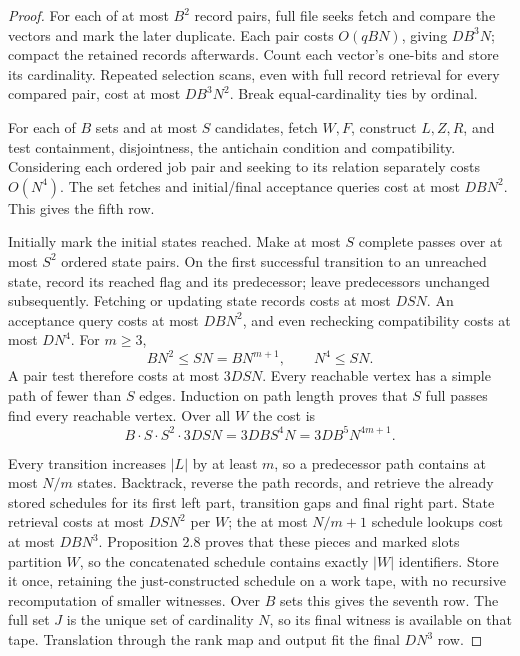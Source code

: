 \begin{proof}
For each of at most $B^2$ record pairs, full file seeks fetch and compare
the vectors and mark the later duplicate. Each pair costs $O(qBN)$,
giving $DB^3N$; compact the retained records afterwards. Count each
vector's one-bits and store its cardinality. Repeated selection scans,
even with full record retrieval for every compared pair, cost at most
$DB^3N^2$. Break equal-cardinality ties by ordinal.

For each of $B$ sets and at most $S$ candidates, fetch $W,F$, construct
$L,Z,R$, and test containment, disjointness, the antichain condition and
compatibility. Considering each ordered job pair and seeking to its
relation separately costs $O(N^4)$. The set fetches and initial/final
acceptance queries cost at most $DBN^2$. This gives the fifth row.

Initially mark the initial states reached. Make at most $S$ complete
passes over at most $S^2$ ordered state pairs. On the first successful
transition to an unreached state, record its reached flag and its
predecessor; leave predecessors unchanged subsequently. Fetching or
updating state records costs at most $DSN$. An acceptance query costs
at most $DBN^2$, and even rechecking compatibility costs at most $DN^4$.
For $m\geq3$,
\[
 BN^2\leq SN=BN^{m+1},\qquad N^4\leq SN.
\]
A pair test therefore costs at most $3DSN$. Every reachable vertex has
a simple path of fewer than $S$ edges. Induction on path length proves
that $S$ full passes find every reachable vertex. Over all $W$ the cost
is
\[
 B\cdot S\cdot S^2\cdot3DSN
   =3DBS^4N=3DB^5N^{4m+1}.\tag{9.3}
\]

Every transition increases $|L|$ by at least $m$, so a predecessor path
contains at most $N/m$ states. Backtrack, reverse the path records, and
retrieve the already stored schedules for its first left part,
transition gaps and final right part. State retrieval costs at most
$DSN^2$ per $W$; the at most $N/m+1$ schedule lookups cost at most
$DBN^3$. Proposition 2.8 proves that these pieces and marked slots
partition $W$, so the concatenated schedule contains exactly $|W|$
identifiers. Store it once, retaining the just-constructed schedule on a work tape,
with no recursive recomputation of smaller witnesses. Over $B$ sets this
gives the seventh row. The full set $J$ is the unique set of cardinality
$N$, so its final witness is available on that tape. Translation through
the rank map and output fit the final $DN^3$ row.


\end{proof}
